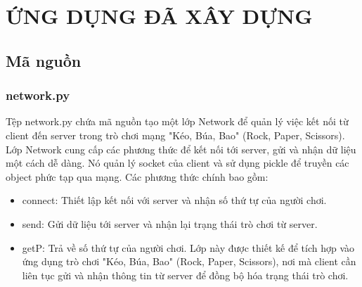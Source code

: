 \documentclass[a4paper]{article}
\begin{document}
\newpage
\section{ỨNG DỤNG ĐÃ XÂY DỰNG}
\subsection{Mã nguồn}
\subsubsection{network.py}
Tệp network.py chứa mã nguồn tạo một lớp Network để quản lý việc kết nối từ client đến server trong trò chơi mạng "Kéo, Búa, Bao" (Rock, Paper, Scissors). Lớp Network cung cấp các phương thức để kết nối tới server, gửi và nhận dữ liệu một cách dễ dàng. Nó quản lý socket của client và sử dụng pickle để truyền các object phức tạp qua mạng. Các phương thức chính bao gồm:
\begin{itemize}
    \item connect: Thiết lập kết nối với server và nhận số thứ tự của người chơi.
    \item send: Gửi dữ liệu tới server và nhận lại trạng thái trò chơi từ server.
    \item getP: Trả về số thứ tự của người chơi.
Lớp này được thiết kế để tích hợp vào ứng dụng trò chơi "Kéo, Búa, Bao" (Rock, Paper, Scissors), nơi mà client cần liên tục gửi và nhận thông tin từ server để đồng bộ hóa trạng thái trò chơi.
\end{itemize}
\end{document}
